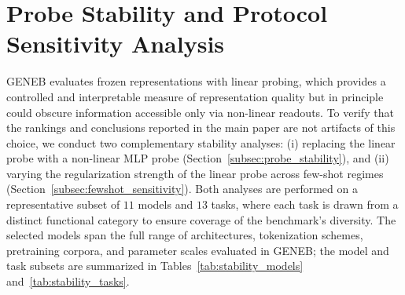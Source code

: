 \documentclass{llmxive}
\begin{document}



\section{Probe Stability and Protocol Sensitivity Analysis}
\label{app:probe_stability}

GENEB evaluates frozen representations with linear probing, which provides
a controlled and interpretable measure of representation quality but in
principle could obscure information accessible only via non-linear readouts.
To verify that the rankings and conclusions reported in the main paper are
not artifacts of this choice, we conduct two complementary stability
analyses: (i) replacing the linear probe with a non-linear MLP probe
(Section~\ref{subsec:probe_stability}), and (ii) varying the regularization
strength of the linear probe across few-shot regimes
(Section~\ref{subsec:fewshot_sensitivity}). Both analyses are performed on
a representative subset of $11$ models and $13$ tasks, where each task is
drawn from a distinct functional category to ensure coverage of the
benchmark's diversity. The selected models span the full range of
architectures, tokenization schemes, pretraining corpora, and parameter
scales evaluated in GENEB; the model and task subsets are summarized in
Tables~\ref{tab:stability_models} and~\ref{tab:stability_tasks}.
\end{document}
